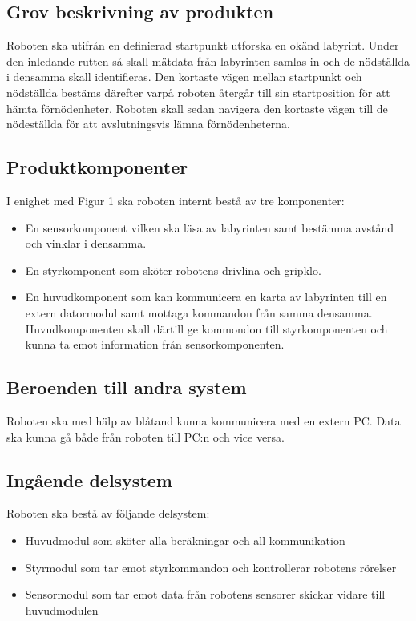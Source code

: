 \documentclass[11pt]{article}
\begin{document}
\begin{flushleft}
\subsection{Grov beskrivning av produkten}

Roboten ska utifrån en definierad startpunkt utforska en okänd labyrint. Under den inledande rutten så skall mätdata från labyrinten samlas in och de nödställda i densamma skall identifieras. Den kortaste vägen mellan startpunkt och nödställda bestäms därefter varpå roboten återgår till sin startposition för att hämta förnödenheter. Roboten skall sedan navigera den kortaste vägen till de nödeställda för att avslutningsvis lämna förnödenheterna.

\subsection{Produktkomponenter}

I enighet med Figur 1 ska roboten internt bestå av tre komponenter:
\begin{itemize}
\item{En sensorkomponent vilken ska läsa av labyrinten samt bestämma avstånd och vinklar i densamma.} 
\item{En styrkomponent som sköter robotens drivlina och gripklo.}
\item{En huvudkomponent som kan kommunicera en karta av labyrinten till en extern datormodul samt mottaga kommandon från samma densamma. Huvudkomponenten skall därtill ge kommondon till styrkomponenten och kunna ta emot information från sensorkomponenten.}  
\end{itemize}  


\subsection{Beroenden till andra system}

Roboten ska med hälp av blåtand kunna kommunicera med en extern PC. Data ska kunna gå både från roboten till PC:n och vice versa.

\subsection{Ingående delsystem}
Roboten ska bestå av följande delsystem:
\begin{itemize}
	\item Huvudmodul som sköter alla beräkningar och all kommunikation
	\item Styrmodul som tar emot styrkommandon och kontrollerar robotens rörelser
	\item Sensormodul som tar emot data från robotens sensorer skickar vidare till huvudmodulen
\end{itemize}


\end{flushleft}
\end{document}
